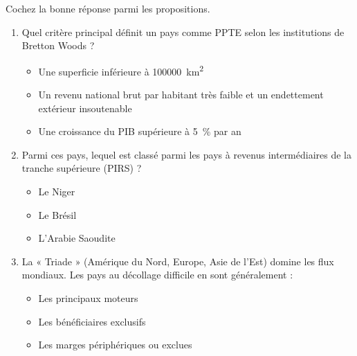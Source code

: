 \documentclass[11pt]{article}
\begin{document}
\begin{exercice}
Cochez la bonne réponse parmi les propositions.
\begin{enumerate}
\item Quel critère principal définit un pays comme PPTE selon les institutions de Bretton Woods ?
\begin{itemize}
\item[$\square$] Une superficie inférieure à \SI{100000}{km^2}
\item[$\square$] Un revenu national brut par habitant très faible et un endettement extérieur insoutenable
\item[$\square$] Une croissance du PIB supérieure à \SI{5}{\%} par an
\end{itemize}
\item Parmi ces pays, lequel est classé parmi les pays à revenus intermédiaires de la tranche supérieure (PIRS) ?
\begin{itemize}
\item[$\square$] Le Niger
\item[$\square$] Le Brésil
\item[$\square$] L'Arabie Saoudite
\end{itemize}
\item La « Triade » (Amérique du Nord, Europe, Asie de l'Est) domine les flux mondiaux. Les pays au décollage difficile en sont généralement :
\begin{itemize}
\item[$\square$] Les principaux moteurs
\item[$\square$] Les bénéficiaires exclusifs
\item[$\square$] Les marges périphériques ou exclues
\end{itemize}
\end{enumerate}
\end{exercice}
\end{document}
